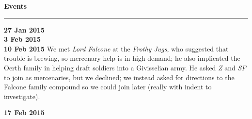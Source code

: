 \documentclass[letterpaper]{article}
\newlength\tindent
\newcommand{\e}[1]{\emph{#1}}
\newcommand{\B}[1]{\textbf{#1}}
\newenvironment{notesection}[1]
{ {\huge \B{#1}}\hrule\vspace{0.5em}\begingroup\fontsize{9pt}{12pt}\selectfont}
{\endgroup}
\begin{document}
\begin{notesection}{Events}
\setlength{\parindent}{\tindent}

\B{27 Jan 2015}
\\
\B{3 Feb 2015}
\\
\B{10 Feb 2015} We met \e{Lord Falcone} at the \e{Frothy Jugs}, who suggested that trouble is brewing, so mercenary help is in high demand; he also implicated the Oerth family in helping draft soldiers into a Givisselian army.  He asked \e{Z} and \e{SF} to join as mercenaries, but we declined; we instead asked for directions to the Falcone family compound so we could join later (really with indent to investigate).

\B{17 Feb 2015}

\end{notesection}
\end{document}
